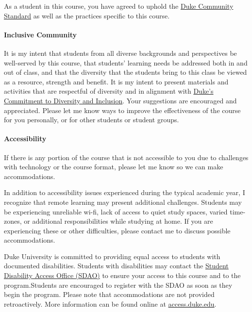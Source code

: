 \documentclass[]{article}
\let\oldparagraph\paragraph
\renewcommand{\paragraph}[1]{\oldparagraph{#1}\mbox{}}
\begin{document}
As a student in this course, you have agreed to uphold the
\href{https://studentaffairs.duke.edu/conduct/about-us/duke-community-standard}{Duke
Community Standard} as well as the practices specific to this course.

\hypertarget{inclusive-community}{%
\paragraph{Inclusive Community}\label{inclusive-community}}

It is my intent that students from all diverse backgrounds and
perspectives be well-served by this course, that students' learning
needs be addressed both in and out of class, and that the diversity that
the students bring to this class be viewed as a resource, strength and
benefit. It is my intent to present materials and activities that are
respectful of diversity and in alignment with
\href{https://provost.duke.edu/initiatives/commitment-to-diversity-and-inclusion}{Duke's
Commitment to Diversity and Inclusion}. Your suggestions are encouraged
and appreciated. Please let me know ways to improve the effectiveness of
the course for you personally, or for other students or student groups.

\hypertarget{accessibility}{%
\paragraph{Accessibility}\label{accessibility}}

If there is any portion of the course that is not accessible to you due
to challenges with technology or the course format, please let me know
so we can make accommodations.

In addition to accessibility issues experienced during the typical
academic year, I recognize that remote learning may present additional
challenges. Students may be experiencing unreliable wi-fi, lack of
access to quiet study spaces, varied time-zones, or additional
responsibilities while studying at home. If you are experiencing these
or other difficulties, please contact me to discuss possible
accommodations.

Duke University is committed to providing equal access to students with
documented disabilities. Students with disabilities may contact the
\href{https://access.duke.edu/students}{Student Disability Access Office
(SDAO)} to ensure your access to this course and to the program.Students
are encouraged to register with the SDAO as soon as they begin the
program. Please note that accommodations are not provided retroactively.
More information can be found online at
\href{https://access.duke.edu/requests}{access.duke.edu}.
\end{document}
